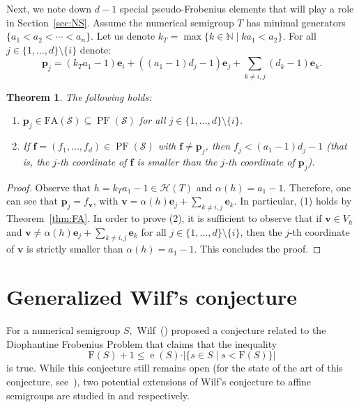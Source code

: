 \documentclass[12pt]{amsart}
\theoremstyle{plain}
\theoremstyle{theorem}
\newtheorem{theorem}[definition]{Theorem}
\theoremstyle{remark}
\begin{document}
  Next, we note down $d-1$ special pseudo-Frobenius elements that will play a role in Section~\ref{sec:NS}. Assume the numerical semigroup $T$ has minimal generators $\{a_1 < a_2< \cdots < a_n\}$. Let us denote $k_T=\max\{k\in \mathbb{N}\mid ka_1<a_2\}$. For all $j\in \{1,\ldots,d\}\setminus \{i\}$ denote:
 $$\mathbf{p}_j=(k_T a_1 -1)\mathbf{e}_i+((a_1-1)d_j-1)\mathbf{e}_j+\sum_{k\neq i,j}(d_k-1)\mathbf{e}_k.$$


 \begin{theorem}\label{PF:structure}
 	 The following holds:
	\begin{enumerate}
		\item $\mathbf{p}_j\in \mathrm{FA}(\mathcal{S}) \subseteq \operatorname{PF}(\mathcal{S})$ for all $j\in \{1,\ldots,d\}\setminus \{i\}$.
 		\item If $\mathbf{f}=(f_1,\ldots,f_d)\in \operatorname{PF}(\mathcal{S})$ with $\mathbf{f}\neq \mathbf{p}_j$, then $f_j<(a_1-1)d_j-1$ (that is, the $j$-th coordinate of $\mathbf{f}$ is smaller than the $j$-th coordinate of $\mathbf{p}_j$). 
 	\end{enumerate}
 \end{theorem}
 \begin{proof}
 	Observe that $h=k_Ta_1-1\in \mathcal{H}(T)$ and $\alpha(h)=a_1-1$. Therefore, one can see that $\mathbf{p}_j=f_\mathbf{v}$, with $\mathbf{v}=\alpha(h)\mathbf{e}_j+\sum_{k\neq i,j}\mathbf{e}_k$. In particular, (1) holds by Theorem~\ref{thm:FA}. In order to prove (2), it is sufficient to observe that if $\mathbf{v}\in V_h$ and $\mathbf{v}\neq \alpha(h)\mathbf{e}_j+\sum_{k\neq i,j}\mathbf{e}_k$ for all $j\in \{1,\ldots,d\}\setminus \{i\}$, then the $j$-th coordinate of $\mathbf{v}$ is strictly smaller than $\alpha(h)=a_1-1$. This concludes the proof.
 \end{proof}



\section{Generalized Wilf's conjecture}\label{sec:Wilf}
For a numerical semigroup $S,$ Wilf~(\cite{Wilf1978}) proposed a conjecture related to the Diophantine Frobenius Problem that claims that the inequality 
\[\mathrm{F}(S)+1 \leq \operatorname{e}(S) \cdot \vert \{ s \in S \mid s < \mathrm{F}(S) \} \vert \] 
is true. While this conjecture still remains open (for the state of the art of this conjecture, see~\cite{DelgadoSurvey}), two potential extensions of Wilf's conjecture to affine semigroups are studied in \cite{Cisto-et-al2020} and \cite{garcia2018extension} respectively.
\end{document}
